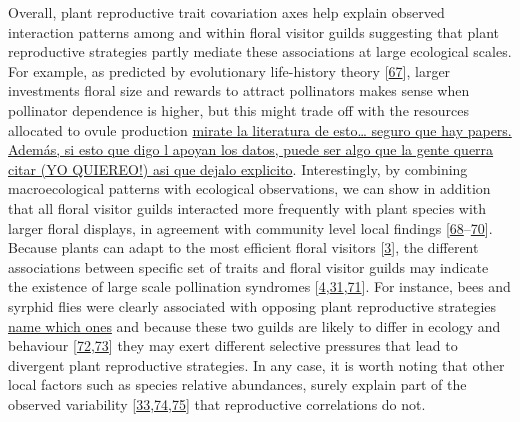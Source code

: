 \documentclass[
  12pt,
  a4paper,
]{article}
\begin{document}
Overall, plant reproductive trait covariation axes help explain observed interaction patterns among and within floral visitor guilds suggesting that plant reproductive strategies partly mediate these associations at large ecological scales. For example, as predicted by evolutionary life-history theory {[}\protect\hyperlink{ref-stebbins1970}{67}{]}, larger investments floral size and rewards to attract pollinators makes sense when pollinator dependence is higher, but this might trade off with the resources allocated to ovule production \href{Anne\%20Leonard\%20tenia\%20algo\%20de\%20eso,\%20creo}{mirate la literatura de esto\ldots{} seguro que hay papers. Además, si esto que digo l apoyan los datos, puede ser algo que la gente querra citar (YO QUIEREO!) asi que dejalo explicito}. Interestingly, by combining macroecological patterns with ecological observations, we can show in addition that all floral visitor guilds interacted more frequently with plant species with larger floral displays, in agreement with community level local findings {[}\protect\hyperlink{ref-hegland2005}{68}--\protect\hyperlink{ref-kaiser2014}{70}{]}. Because plants can adapt to the most efficient floral visitors {[}\protect\hyperlink{ref-fenster2004}{3}{]}, the different associations between specific set of traits and floral visitor guilds may indicate the existence of large scale pollination syndromes {[}\protect\hyperlink{ref-dellinger2020}{4},\protect\hyperlink{ref-rosas2014}{31},\protect\hyperlink{ref-faegri2013}{71}{]}. For instance, bees and syrphid flies were clearly associated with opposing plant reproductive strategies \href{}{name which ones} and because these two guilds are likely to differ in ecology and behaviour {[}\protect\hyperlink{ref-rader2020}{72},\protect\hyperlink{ref-foldesi2021}{73}{]} they may exert different selective pressures that lead to divergent plant reproductive strategies. In any case, it is worth noting that other local factors such as species relative abundances, surely explain part of the observed variability {[}\protect\hyperlink{ref-bartomeus2016}{33},\protect\hyperlink{ref-vazquez2007}{74},\protect\hyperlink{ref-encinas2012}{75}{]} that reproductive correlations do not.
\end{document}
